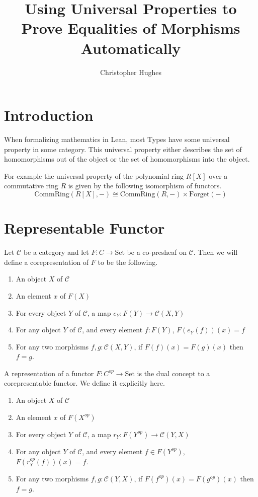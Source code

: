 \documentclass[12pt]{article} %
\title{Using Universal Properties to Prove Equalities of Morphisms Automatically}
\author{Christopher Hughes}
\theoremstyle{definition}
\theoremstyle{definition}
\theoremstyle{definition}
\theoremstyle{definition}
\begin{document}
\section{Introduction}

When formalizing mathematics in Lean, most Types have some universal property in some
category. This universal property either describes the set of homomorphisms out of
the object or the set of homomorphisms into the object. 

For example the universal property of the polynomial ring $R[X]$ over 
a commutative ring $R$ is given by the following isomorphism of functors.
\begin{equation}
\text{CommRing}(R[X], -) \cong \text{CommRing}(R, -) \times \text{Forget}(-)
\end{equation}


\section{Representable Functor}

Let $\mathcal{C}$ be a category and let $F : C \to \text{Set}$
be a co-presheaf on $\mathcal{C}$. Then we will define a corepresentation of
$F$ to be the following.

\begin{enumerate}
  \item An object $X$ of $\mathcal{C}$
  \item An element $x$ of $F(X)$
  \item For every object $Y$ of $\mathcal{C}$, a map $e_Y : F(Y) \to \mathcal{C}(X, Y)$
  \item For any object $Y$ of $\mathcal{C}$, and every element $f : F(Y)$, $F(e_Y(f))(x) = f$
  \item For any two morphisms $f, g : \mathcal{C}(X, Y)$, if $F(f)(x) = F(g)(x)$ then $f = g$.
\end{enumerate}

A representation of a functor $F : C^{op} \to \text{Set}$ is the dual concept to a corepresentable
functor. We define it explicitly here.

\begin{enumerate}
  \item An object $X$ of $\mathcal{C}$
  \item An element $x$ of $F(X^{op})$
  \item For every object $Y$ of $\mathcal{C}$, a map $r_Y : F(Y^{op}) \to \mathcal{C}(Y, X)$
  \item For any object $Y$ of $\mathcal{C}$, and every element $f \in F(Y^{op})$, $F(r_Y^{op}(f))(x) = f$.
  \item For any two morphisms $f, g : \mathcal{C}(Y, X)$, if $F(f^{op})(x) = F(g^{op})(x)$ then $f = g$.
\end{enumerate}
\end{document}
